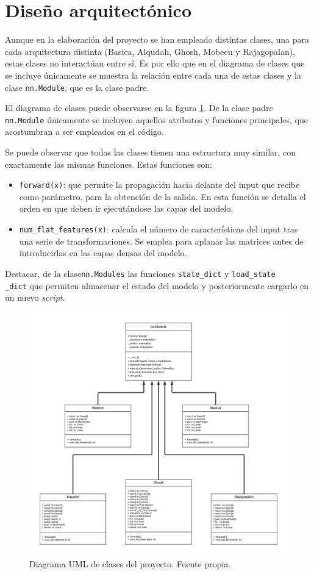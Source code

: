 
\section{Diseño arquitectónico}

Aunque en la elaboración del proyecto se han empleado distintas clases, una para cada arquitectura distinta (Basica, Alqudah, Ghosh, Mobeen y Rajagopalan), estas clases no interactúan entre sí. Es por ello que en el diagrama de clases que se incluye únicamente se muestra la relación entre cada una de estas clases y la clase \texttt{nn.Module}, que es la clase padre.

El diagrama de clases puede observarse en la figura \ref{fig:uml}. De la clase padre \texttt{nn.Module} únicamente se incluyen aquellos atributos y funciones principales, que acostumbran a ser empleados en el código.

Se puede observar que todas las clases tienen una estructura muy similar, con exactamente las mismas funciones. Estas funciones son:
\begin{itemize}
    \item \texttt{forward(x)}: que permite la propagación hacia delante del input que recibe como parámetro, para la obtención de la salida. En esta función se detalla el orden en que deben ir ejecutándose las capas del modelo.
    \item \texttt{num\_flat\_features(x)}: calcula el número de características del input tras una serie de transformaciones. Se emplea para aplanar las matrices antes de introducirlas en las capas densas del modelo.
\end{itemize}

Destacar, de la clase\texttt{nn.Modules} las funciones \texttt{state\_dict} y \texttt{load\_state\\\_dict} que permiten almacenar el estado del modelo y posteriormente cargarlo en un nuevo \textit{script}.

\begin{figure}[h]
    \centering
    \includegraphics[width=1\textwidth]{img/UML_proyecto.png}
    \caption{Diagrama UML de clases del proyecto. Fuente propia.}
    \label{fig:uml}
\end{figure}
